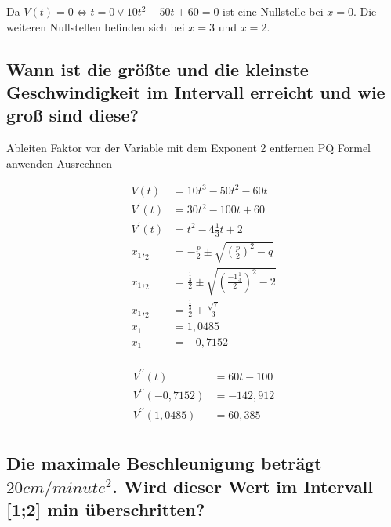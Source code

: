 \documentclass[a4paper,11pt]{scrartcl}
\begin{document}
Da $V(t) = 0 \Leftrightarrow t = 0 \vee 10t^2 - 50t + 60 = 0$ ist eine
Nullstelle bei $x = 0$. Die weiteren Nullstellen befinden sich bei $x = 3$ und
$x = 2$.

\subsection{Wann ist die grö{\ss}te und die kleinste Geschwindigkeit im
Intervall erreicht und wie gro{\ss} sind diese?}

\begin{outline}
  \1 Ableiten
  \1 Faktor vor der Variable mit dem Exponent 2 entfernen
  \1 PQ Formel anwenden
  \1 Ausrechnen
\end{outline}

\begin{align*}
  V(t) &= 10t^3 - 50t^2 - 60t                                                           \\
  V^\prime(t) &= 30t^2 - 100t + 60                                                      \\
  V^\prime(t) &= t^2  - 4\frac{1}{3}t + 2                                               \\
  x_1,_2 &= -\frac{p}{2} \pm \sqrt{\left(\frac{p}{2}\right)^2 - q}                      \\
  x_1,_2 &= \frac{\frac{1}{3}}{2} \pm \sqrt{\left(\frac{-1\frac{1}{3}}{2}\right)^2 - 2} \\
  x_1,_2 &= \frac{\frac{1}{3}}{2} \pm \frac{{\sqrt{7}}}{3}                              \\
  x_1   &= 1,0485                                                                       \\
  x_1   &= -0,7152                                                                      \\
\end{align*}

\begin{align*}
  V^{\prime\prime}(t) &= 60t - 100      \\
  V^{\prime\prime}(-0,7152) &= -142,912 \\
  V^{\prime\prime}(1,0485) &= 60,385    \\
\end{align*}

\subsection{Die maximale Beschleunigung beträgt $20cm / minute^2$. Wird dieser
Wert im Intervall [1;2] min überschritten?}
\end{document}
